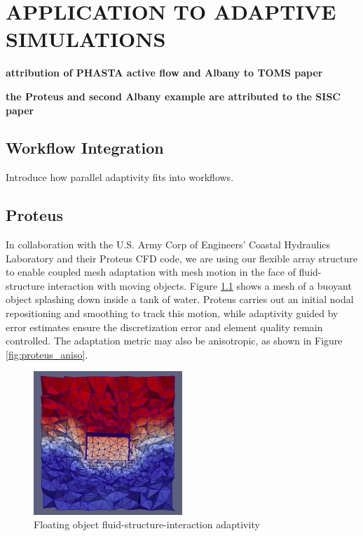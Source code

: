 
\chapter{APPLICATION TO ADAPTIVE SIMULATIONS}
\label{chap:apps}

{\bf attribution of PHASTA active flow and Albany to TOMS paper}

{\bf the Proteus and second Albany example are attributed to the SISC paper}

\section{Workflow Integration}

Introduce how parallel adaptivity fits into workflows.

\section{Proteus}

In collaboration with the U.S. Army Corp of Engineers'
Coastal Hydraulics Laboratory and their Proteus CFD code,
we are using our flexible array structure to enable
coupled mesh adaptation with mesh motion in the face
of fluid-structure interaction with moving objects.
Figure \ref{fig:proteus} shows a mesh of a buoyant object
splashing down inside a tank of water.
Proteus carries out an initial nodal repositioning and
smoothing to track this motion, while adaptivity
guided by error estimates ensure the discretization
error and element quality remain controlled.
The adaptation metric may also be anisotropic, as shown
in Figure \ref{fig:proteus_aniso}.

\begin{figure}
\begin{center}
\includegraphics[width=0.5\textwidth]{proteus.png}
\caption{Floating object fluid-structure-interaction adaptivity}
\label{fig:proteus}
\end{center}
\end{figure}

